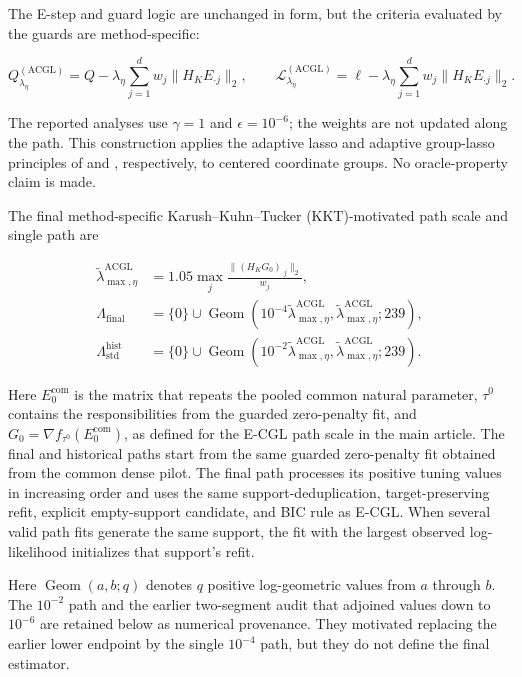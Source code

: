 \documentclass[preprint,12pt,authoryear]{elsarticle}
\begin{document}
The E-step and guard logic are unchanged in form, but the criteria evaluated
by the guards are method-specific:

\[
Q_{\lambda_\eta}^{(\mathrm{ACGL})}
=Q-\lambda_\eta\sum_{j=1}^d
w_j\lVert H_KE_{\cdot j}\rVert_2,
\qquad
\mathcal L_{\lambda_\eta}^{(\mathrm{ACGL})}
=\ell-\lambda_\eta\sum_{j=1}^d
w_j\lVert H_KE_{\cdot j}\rVert_2.
\]

The reported analyses use $\gamma=1$ and $\epsilon=10^{-6}$; the weights are
not updated along the path. This construction applies the adaptive lasso and
adaptive group-lasso principles of \citet{zou2006adaptive} and
\citet{wang2008adaptivegroup}, respectively, to centered coordinate groups.
No oracle-property claim is made.

The final method-specific Karush--Kuhn--Tucker (KKT)-motivated path scale and
single path are

\begin{equation}
\label{eq:supp-eacgl-paths}
\begin{aligned}
\widetilde\lambda_{\max,\eta}^{\mathrm{ACGL}}
&=1.05\max_j
\frac{\lVert(H_KG_0)_{\cdot j}\rVert_2}{w_j},\\
\Lambda_{\mathrm{final}}
&=\{0\}\cup
\operatorname{Geom}
\left(10^{-4}\widetilde\lambda_{\max,\eta}^{\mathrm{ACGL}},
\widetilde\lambda_{\max,\eta}^{\mathrm{ACGL}};239\right),\\
\Lambda_{\mathrm{std}}^{\mathrm{hist}}
&=\{0\}\cup
\operatorname{Geom}
\left(10^{-2}\widetilde\lambda_{\max,\eta}^{\mathrm{ACGL}},
\widetilde\lambda_{\max,\eta}^{\mathrm{ACGL}};239\right).
\end{aligned}
\end{equation}

Here $E_0^{\mathrm{com}}$ is the matrix that repeats the pooled common natural
parameter, $\tau^0$ contains the responsibilities from the guarded zero-penalty
fit, and $G_0=\nabla f_{\tau^0}(E_0^{\mathrm{com}})$, as defined for the E-CGL
path scale in the main article. The final and
historical paths start from the same guarded zero-penalty fit obtained from
the common dense pilot. The final path processes its positive
tuning values in increasing order and uses the same support-deduplication,
target-preserving refit, explicit empty-support candidate, and BIC rule as
E-CGL. When several valid path fits generate the same support, the fit with
the largest observed log-likelihood initializes that support's refit.

Here $\operatorname{Geom}(a,b;q)$ denotes $q$ positive log-geometric values
from $a$ through $b$. The $10^{-2}$ path and the earlier two-segment audit that
adjoined values down to $10^{-6}$ are retained below as numerical provenance.
They motivated replacing the earlier lower endpoint by the single
$10^{-4}$ path, but they do not define the final estimator.
\end{document}
